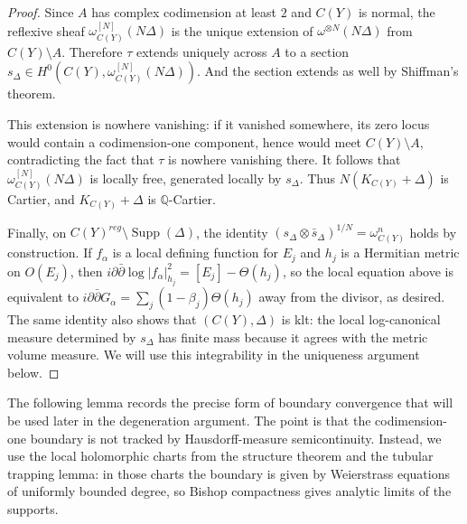 \documentclass[11pt]{amsart}
\theoremstyle{definition}
\theoremstyle{remark}
\begin{document}
\begin{proof}
    Since $A$ has complex codimension at least $2$ and $C(Y)$ is normal, the reflexive sheaf $\omega_{C(Y)}^{[N]}(N\Delta)$ is the unique extension of $\omega^{\otimes N}(N\Delta)$ from $C(Y)\setminus A$. Therefore $\tau$ extends uniquely across $A$ to a section $s_\Delta \in H^0(C(Y), \omega_{C(Y)}^{[N]}(N\Delta))$. And the section extends as well by Shiffman's theorem. 
    
    This extension is nowhere vanishing: if it vanished somewhere, its zero locus would contain a codimension-one component, hence would meet $C(Y)\setminus A$, contradicting the fact that $\tau$ is nowhere vanishing there. It follows that $\omega_{C(Y)}^{[N]}(N\Delta)$ is locally free, generated locally by $s_\Delta$. Thus $N(K_{C(Y)}+\Delta)$ is Cartier, and $K_{C(Y)}+\Delta$ is $\mathbb{Q}$-Cartier.
    
    Finally, on $C(Y)^{reg}\setminus \operatorname{Supp}(\Delta)$, the identity $(s_\Delta \otimes \bar{s}_\Delta)^{1/N} = \omega_{C(Y)}^n$ holds by construction. If $f_\alpha$ is a local defining function for $E_j$ and $h_j$ is a Hermitian metric on $O(E_j)$, then $i\partial \bar{\partial} \log |f_\alpha|_{h_j}^2 = [E_j] - \Theta(h_j)$, so the local equation above is equivalent to $i\partial \bar{\partial} G_\alpha = \sum_j (1-\beta_j)\Theta(h_j)$ away from the divisor, as desired. 
    The same identity also shows that $(C(Y),\Delta)$ is klt: the local
log-canonical measure determined by $s_\Delta$ has finite mass because it agrees
with the metric volume measure. We will use this integrability in the uniqueness
argument below.
    
\end{proof}

The following lemma records the precise form of boundary convergence that will be
used later in the degeneration argument. The point is that the codimension-one
boundary is not tracked by Hausdorff-measure semicontinuity. Instead, we use the
local holomorphic charts from the structure theorem and the tubular trapping
lemma: in those charts the boundary is given by Weierstrass equations of
uniformly bounded degree, so Bishop compactness gives analytic limits of the
supports.
\end{document}
